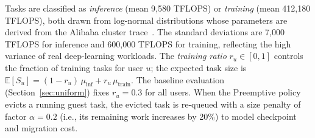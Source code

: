 
Tasks are classified as \emph{inference} (mean 9,580 TFLOPS)
or \emph{training} (mean 412,180 TFLOPS),
both drawn from log-normal distributions whose parameters are derived
from the Alibaba cluster trace~\cite{jeon2019analysis}.
The standard deviations are 7,000 TFLOPS for inference and 600,000 TFLOPS for training,
reflecting the high variance of real deep-learning workloads.
The \emph{training ratio} $r_u \in [0, 1]$ controls the fraction of
training tasks for user $u$; the expected task size is
$\mathbb{E}[S_u] = (1 - r_u)\,\mu_\mathrm{inf} + r_u\,\mu_\mathrm{train}$.
The baseline evaluation (Section~\ref{sec:uniform}) fixes $r_u = 0.3$ for all users.
When the Preemptive policy evicts a running guest task, the evicted task
is re-queued with a size penalty of factor $\alpha = 0.2$
(i.e., its remaining work increases by 20\%) to model checkpoint and migration cost.




